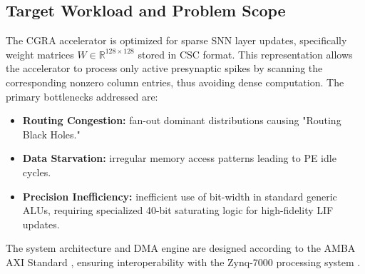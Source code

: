 \subsection{Target Workload and Problem Scope}
The CGRA accelerator is optimized for sparse SNN layer updates, specifically weight matrices $W \in \mathbb{R}^{128 \times 128}$ stored in CSC format. This representation allows the accelerator to process only active presynaptic spikes by scanning the corresponding nonzero column entries, thus avoiding dense computation. 
The primary bottlenecks addressed are:
\begin{itemize}
    \item \textbf{Routing Congestion:} fan-out dominant distributions causing "Routing Black Holes."
    \item \textbf{Data Starvation:} irregular memory access patterns leading to PE idle cycles.
    \item \textbf{Precision Inefficiency:} inefficient use of bit-width in standard generic ALUs, requiring specialized 40-bit saturating logic for high-fidelity LIF updates.
\end{itemize}

The system architecture and DMA engine are designed according to the AMBA AXI Standard \cite{arm_amba_axi}, ensuring interoperability with the Zynq-7000 processing system \cite{xilinx_ug1085}.

